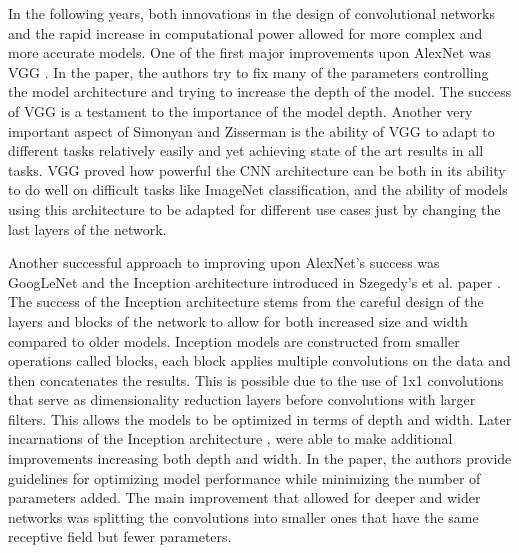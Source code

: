 \documentclass[../main.tex]{subfiles}
\begin{document}
In the following years, both innovations in the design of convolutional networks and the rapid increase in computational power allowed for more complex and more accurate models.
One of the first major improvements upon AlexNet was VGG \cite{vgg}. In the paper, the authors try to fix many of the parameters controlling the model architecture and trying to increase the depth of the model.
The success of VGG is a testament to the importance of the model depth.
Another very important aspect of Simonyan and Zisserman \cite{vgg} is the ability of VGG to adapt to different tasks relatively easily and yet achieving state of the art results in all tasks.
VGG proved how powerful the CNN architecture can be both in its ability to do well on difficult tasks like ImageNet classification,
and the ability of models using this architecture to be adapted for different use cases just by changing the last layers of the network.
\par

Another successful approach to improving upon AlexNet's success was GoogLeNet and the Inception architecture introduced in Szegedy's et al. paper \cite{inception}.
The success of the Inception architecture stems from the careful design of the layers and blocks of the network to allow for both increased size and width compared to older models.
Inception models are constructed from smaller operations called blocks, each block applies multiple convolutions on the data and then concatenates the results.
This is possible due to the use of 1x1 convolutions that serve as dimensionality reduction layers before convolutions with larger filters.
This allows the models to be optimized in terms of depth and width.
Later incarnations of the Inception architecture \cite{inceptionv2-3}, were able to make additional improvements increasing both depth and width.
In the paper, the authors provide guidelines for optimizing model performance while minimizing the number of parameters added.
The main improvement that allowed for deeper and wider networks was splitting the convolutions into smaller ones that have the same receptive field but fewer parameters.
\par
\end{document}
